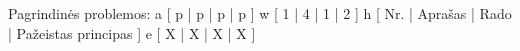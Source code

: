Pagrindinės problemos:
\xtableu
{
  a [ p | p | p | p ]
  w [ 1 | 4 | 1 | 2 ]
  h [ Nr. | Aprašas | Rado | Pažeistas principas ]
  e [ X | X | X | X ]
}